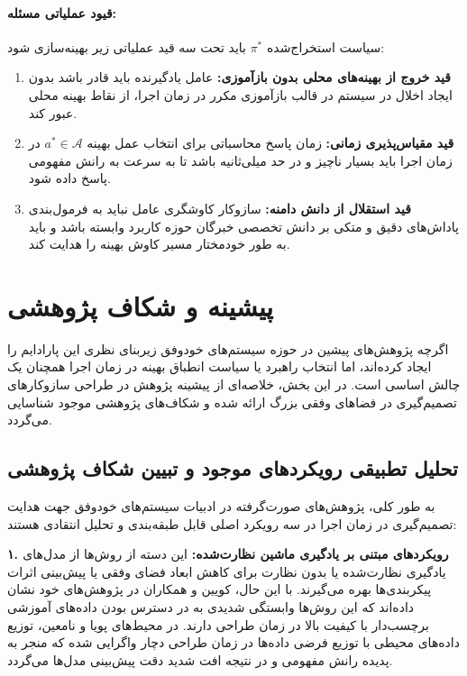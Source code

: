 \documentclass[oneside,openany,phd]{TMU-Thesis}
\begin{document}
\paragraph{قیود عملیاتی مسئله:}
سیاست استخراج‌شده $\pi^*$ باید تحت سه قید عملیاتی زیر بهینه‌سازی شود:
\begin{enumerate}
    \item \textbf{قید خروج از بهینه‌های محلی بدون بازآموزی:} عامل یادگیرنده باید قادر باشد بدون ایجاد اخلال در سیستم در قالب بازآموزی مکرر در زمان اجرا، از نقاط بهینه محلی عبور کند.
    \item \textbf{قید مقیاس‌پذیری زمانی:} زمان پاسخ محاسباتی برای انتخاب عمل بهینه $a^* \in \mathcal{A}$ در زمان اجرا باید بسیار ناچیز و در حد میلی‌ثانیه باشد تا به سرعت به رانش مفهومی پاسخ داده شود.
    \item \textbf{قید استقلال از دانش دامنه:} سازوکار کاوشگری عامل نباید به فرمول‌بندی پاداش‌های دقیق و متکی بر دانش تخصصی خبرگان حوزه کاربرد وابسته باشد و باید به طور خودمختار مسیر کاوش بهینه را هدایت کند.
\end{enumerate}

\section*{پیشینه و شکاف پژوهشی}

اگرچه پژوهش‌های پیشین در حوزه سیستم‌های خودوفق زیربنای نظری این پارادایم را ایجاد کرده‌اند، اما انتخاب راهبرد یا سیاست انطباق بهینه در زمان اجرا همچنان یک چالش اساسی است. در این بخش، خلاصه‌ای از پیشینه پژوهش در طراحی سازوکارهای تصمیم‌گیری در فضاهای وفقی بزرگ ارائه شده و شکاف‌های پژوهشی موجود شناسایی می‌گردد.

\subsection*{تحلیل تطبیقی رویکردهای موجود و تبیین شکاف پژوهشی}

به طور کلی، پژوهش‌های صورت‌گرفته در ادبیات سیستم‌های خودوفق جهت هدایت تصمیم‌گیری در زمان اجرا در سه رویکرد اصلی قابل طبقه‌بندی و تحلیل انتقادی هستند:

\textbf{۱. رویکردهای مبتنی بر یادگیری ماشین نظارت‌شده:} این دسته از روش‌ها از مدل‌های یادگیری نظارت‌شده یا بدون نظارت برای کاهش ابعاد فضای وفقی یا پیش‌بینی اثرات پیکربندی‌ها بهره می‌گیرند. با این حال، کویین و همکاران در پژوهش‌های خود \cite{quin2019efficient, quin2022reducing} نشان داده‌اند که این روش‌ها وابستگی شدیدی به در دسترس بودن داده‌های آموزشی برچسب‌دار با کیفیت بالا در زمان طراحی دارند. در محیط‌های پویا و نامعین، توزیع داده‌های محیطی با توزیع فرضی داده‌ها در زمان طراحی دچار واگرایی شده که منجر به پدیده رانش مفهومی \cite{gheibi2024dealing} و در نتیجه افت شدید دقت پیش‌بینی مدل‌ها می‌گردد.
\end{document}
